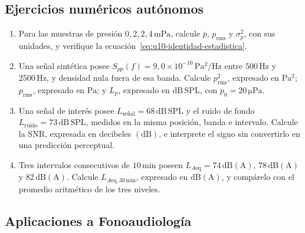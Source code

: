 \subsection*{Ejercicios numéricos autónomos}

\begin{enumerate}[label=\textbf{A\arabic*.},leftmargin=*]
    \item Para las muestras de presión
    \(0,2,2,4\,\mathrm{mPa}\), calcule
    \(\overline p\), \(p_{\mathrm{rms}}\) y \(\sigma_p^2\), con sus unidades,
    y verifique la ecuación~\eqref{eq:u10-identidad-estadistica}.

    \item Una señal sintética posee
    \(S_{pp}(f)=9{,}0\times10^{-10}\,\mathrm{Pa^2/Hz}\) entre
    \(500\,\mathrm{Hz}\) y \(2500\,\mathrm{Hz}\), y densidad nula fuera de esa
    banda. Calcule \(p_{\mathrm{rms}}^2\), expresado en
    \(\mathrm{Pa^2}\); \(p_{\mathrm{rms}}\), expresado en
    \(\mathrm{Pa}\); y \(L_p\), expresado en \(\mathrm{dB\,SPL}\), con
    \(p_0=20\,\mathrm{\mu Pa}\).

    \item Una señal de interés posee
    \(L_{\text{señal}}=68\,\mathrm{dB\,SPL}\) y el ruido de fondo
    \(L_{\text{ruido}}=73\,\mathrm{dB\,SPL}\), medidos en la misma posición,
    banda e intervalo. Calcule la SNR, expresada en decibeles
    \((\mathrm{dB})\), e interprete el signo sin convertirlo en una predicción
    perceptual.

    \item Tres intervalos consecutivos de \(10\,\mathrm{min}\) poseen
    \(L_{A\mathrm{eq}}=74\,\mathrm{dB(A)}\),
    \(78\,\mathrm{dB(A)}\) y \(82\,\mathrm{dB(A)}\). Calcule
    \(L_{A\mathrm{eq},30\,\mathrm{min}}\), expresado en \(\mathrm{dB(A)}\), y compárelo
    con el promedio aritmético de los tres niveles.
\end{enumerate}

\subsection*{Aplicaciones a Fonoaudiología}

